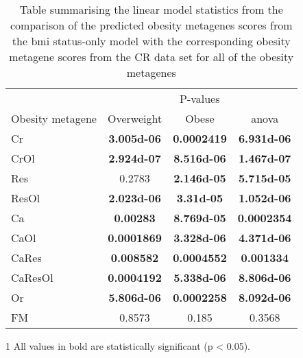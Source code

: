 	\begin{table}[htpb]
		\centering
		\caption[Summary of the statistics from the comparison of all the predicted obesity metagene scores from the \gls{bmi} status-only model with the corresponding obesity metagenes from the CR data]{Table summarising the linear model statistics from the comparison of the predicted obesity metagenes scores from the \gls{bmi} status-only model with the corresponding obesity metagene scores from the CR data set for all of the obesity metagenes}
		\label{tab:bmi_status_cr}
		\begin{threeparttable}
			\begin{tabular}{lccc}
				& \multicolumn{3}{c}{ P-values} \\
				\cmidrule(r){2-4}
				Obesity metagene & Overweight & Obese & \gls{anova} \\
				\hline
				\hline
				\rule{0pt}{2.25ex}Cr & {\bfseries \num{3.005d-06}} \tnote{1} & \bfseries 0.0002419       & \bfseries \num{6.931d-06} \\
				CrOl                 & \bfseries \num{2.924d-07}           & \bfseries \num{8.516d-06} & \bfseries \num{1.467d-07} \\
				Res                  & 0.2783                              & \bfseries \num{2.146d-05} & \bfseries \num{5.715d-05} \\
				ResOl                & \bfseries \num{2.023d-06}           & \bfseries \num{3.31d-05}  & \bfseries \num{1.052d-06} \\
				Ca                   & \bfseries 0.00283                   & \bfseries \num{8.769d-05} & \bfseries 0.0002354       \\
				CaOl                 & \bfseries 0.0001869                 & \bfseries \num{3.328d-06} & \bfseries \num{4.371d-06} \\
				CaRes                & \bfseries 0.008582                  & \bfseries 0.0004552       & \bfseries 0.001334        \\
				CaResOl              & \bfseries 0.0004192                 & \bfseries \num{5.338d-06} & \bfseries \num{8.806d-06} \\
				Or                   & \bfseries \num{5.806d-06}           & \bfseries 0.0002258       & \bfseries \num{8.092d-06} \\
				FM                   & 0.8573                              & 0.185                     & 0.3568          \\
				\hline
				\hline
			\end{tabular}
			\begin{tablenotes}
				\begin{footnotesize}
				\item [1] All values in bold are statistically significant (p \textless{} 0.05).
				\end{footnotesize}
			\end{tablenotes}
		\end{threeparttable}
	\end{table}

